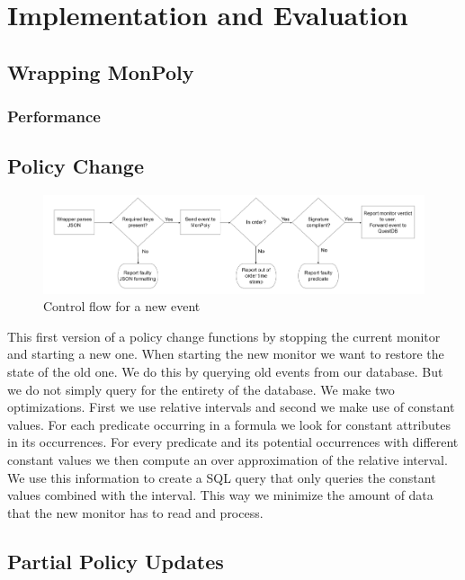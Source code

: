 \chapter{Implementation and Evaluation}

\section{Wrapping MonPoly}

\subsection{Performance}


\section{Policy Change}
% 

\begin{figure}
    \label{fig:flowchart}
    \centering
    \includegraphics[width=\linewidth]{diagrams/flowchart-2.png}
    \caption{Control flow for a new event}
\end{figure}

This first version of a policy change functions by stopping the current monitor and starting a new one.
When starting the new monitor we want to restore the state of the old one.
We do this by querying old events from our database.
But we do not simply query for the entirety of the database.
We make two optimizations.
First we use relative intervals and second we make use of constant values.
For each predicate occurring in a formula we look for constant attributes in its occurrences.
For every predicate and its potential occurrences with different constant values we then compute an over approximation of the relative interval.
We use this information to create a SQL query that only queries the constant values combined with the interval.
This way we minimize the amount of data that the new monitor has to read and process.


\section{Partial Policy Updates}